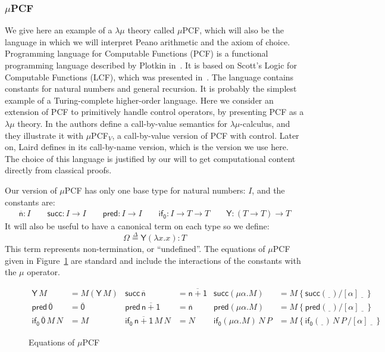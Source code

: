 \documentclass{CSML}
\newcommand*\Def{\mathrel{\overset{\Delta}{=}}}
\newcommand*\LmSortTo\to
\newcommand*\LmSortA{T}
\newcommand*\LmTerm[2]{#1\mathrel{:}#2}
\newcommand*\LmTermA{M}
\newcommand*\LmTermB{N}
\newcommand*\LmTermC{P}
\newcommand*\LmMVarA\alpha
\newcommand*\LmConst[1]{\mathsf{#1}}
\newcommand*\LmSubst[1]{\left\{#1\right\}}
\newcommand*\CALmn[1]{\LmConst{\overline{#1}}}
\newcommand*\CALmnSort{I}
\newcommand*\CALmom{\LmConst{\Omega}}
\newcommand*\CALmsucc{\LmConst{succ}}
\newcommand*\CALmsuccSort{\CALmnSort\LmSortTo\CALmnSort}
\newcommand*\CALmfix{\LmConst{Y}}
\newcommand*\CALmfixSort[1]{\left(#1\LmSortTo#1\right)\LmSortTo#1}
\newcommand*\CALmifz{\LmConst{if_0}}
\newcommand*\CALmifzSort[1]{\CALmnSort\LmSortTo#1\LmSortTo#1}
\newcommand*\CALmpred{\LmConst{pred}}
\begin{document}
\subsubsection{\texorpdfstring{$\mu$}{mu}PCF}
\label{muPCF}
We give here an example of a $\lambda\mu$ theory called $\mu$PCF, which will also be the language in which we will interpret Peano arithmetic and the axiom of choice. Programming language for Computable Functions (PCF) is a functional programming language described by Plotkin in~\cite{PlotkinPCF}. It is based on Scott's Logic for Computable Functions (LCF), which was presented in~\cite{ScottLCF}. The language contains constants for natural numbers and general recursion. It is probably the simplest example of a Turing-complete higher-order language. Here we consider an extension of PCF to primitively handle control operators, by presenting PCF as a $\lambda\mu$ theory. In \cite{OngStewartControl} the authors define a call-by-value semantics for $\lambda\mu$-calculus, and they illustrate it with $\mu$PCF$_V$, a call-by-value version of PCF with control. Later on, Laird defines in \cite{LairdThesis} its call-by-name version, which is the version we use here. The choice of this language is justified by our will to get computational content directly from classical proofs.\par
Our version of $\mu$PCF has only one base type for natural numbers: $\CALmnSort$, and the constants are:
\begin{gather*}
\LmTerm{\CALmn{n}}{\CALmnSort}\qquad\LmTerm{\CALmsucc}{\CALmsuccSort}\qquad\LmTerm{\CALmpred}{\CALmsuccSort}\qquad\LmTerm{\CALmifz}{\CALmifzSort{\LmSortA}}\qquad\LmTerm{\CALmfix}{\CALmfixSort{\LmSortA}}
\end{gather*}
It will also be useful to have a canonical term on each type so we define:
$$\CALmom\Def\LmTerm{\CALmfix\left(\lambda x.x\right)}{\LmSortA}$$
This term represents non-termination, or ``undefined''. The equations of $\mu$PCF given in Figure~\ref{muPCFEq} are standard and include the interactions of the constants with the $\mu$ operator.
\begin{figure}
\begin{align*}
\CALmfix\,\LmTermA&=\LmTermA\left(\CALmfix\,\LmTermA\right)
&
\CALmsucc\,\CALmn{n}&=\CALmn{n+1}
&
\CALmsucc\left(\mu\LmMVarA.\LmTermA\right)&=\LmTermA\LmSubst{\CALmsucc\left(\underline{\ \ }\right)/\left[\LmMVarA\right]\,\underline{\ \ }\,}
\\
\CALmpred\,\CALmn{0}&=\CALmn{0}
&
\CALmpred\,\CALmn{n+1}&=\CALmn{n}
&
\CALmpred\left(\mu\LmMVarA.\LmTermA\right)&=\LmTermA\LmSubst{\CALmpred\left(\underline{\ \ }\right)/\left[\LmMVarA\right]\,\underline{\ \ }\,}
\\
\CALmifz\,\CALmn{0}\,\LmTermA\,\LmTermB&=\LmTermA
&
\CALmifz\,\CALmn{n+1}\,\LmTermA\,\LmTermB&=\LmTermB
&
\CALmifz\left(\mu\LmMVarA.\LmTermA\right)\,\LmTermB\,\LmTermC&=\LmTermA\LmSubst{\CALmifz\left(\underline{\ \ }\right)\,\LmTermB\,\LmTermC\,/\left[\LmMVarA\right]\,\underline{\ \ }\,}
\end{align*}
\caption{Equations of $\mu$PCF}
\label{muPCFEq}
\end{figure}
\end{document}
